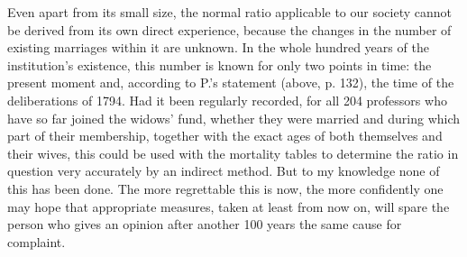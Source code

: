 Even apart from its small size, the normal ratio applicable to our society cannot be derived from its own direct experience, because the changes in the number of existing marriages within it are unknown. In the whole hundred years of the institution's existence, this number is known for only two points in time: the present moment and, according to P.'s statement (above, p. 132), the time of the deliberations
of 1794. Had it been regularly recorded, for all 204 professors who have so far joined the widows' fund, whether they were married and during which part of their membership, together with the exact ages of both themselves and their wives, this could be used with the mortality tables to determine the ratio in question very accurately by an indirect method. But to my knowledge none of this has been done. The more regrettable this is now, the more confidently one may hope that appropriate measures, taken at least from now on, will spare the person who gives an opinion after another 100 years the same cause for complaint.

